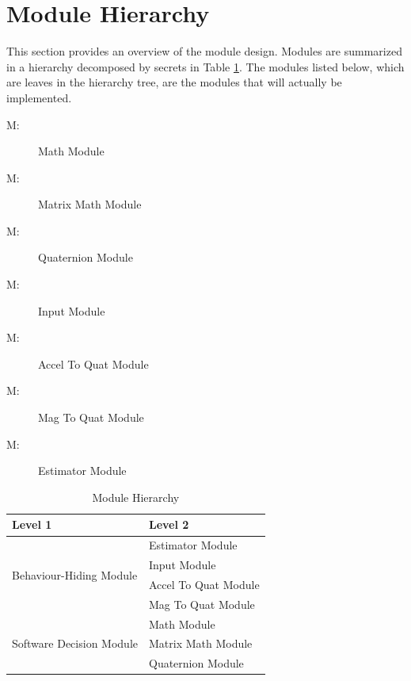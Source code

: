 \documentclass[12pt, titlepage]{article}
\newcounter{mnum}
\newcommand{\mthemnum}{M\themnum}
\begin{document}
\section{Module Hierarchy} \label{SecMH}

This section provides an overview of the module design. Modules are summarized in a hierarchy
decomposed by secrets in Table \ref{TblMH}. The modules listed below, which are leaves in the
hierarchy tree, are the modules that will actually be implemented.

\begin{description}
\item [ \mthemnum \label{m:mm}:] Math Module
\item [ \mthemnum \label{m:mmm}:] Matrix Math Module
\item [ \mthemnum \label{m:qm}:] Quaternion Module
\item [ \mthemnum \label{m:im}:] Input Module
\item [ \mthemnum \label{m:iqwomm}:] Accel To Quat
Module
\item [ \mthemnum \label{m:iqwmm}:] Mag To Quat Module
\item [ \mthemnum \label{m:em}:] Estimator Module
\end{description}


\begin{table}[h!]
\centering
\begin{tabular}{p{} p{}}
\toprule
\textbf{Level 1} & \textbf{Level 2}\\
\midrule


\multirow{4}{0.3\textwidth}{Behaviour-Hiding Module} & Estimator Module \\
  & Input Module \\
  & Accel To Quat Module \\
  & Mag To Quat Module \\
\midrule
\multirow{3}{0.3\textwidth}{Software Decision Module} & Math Module\\
  & Matrix Math Module \\
  & Quaternion Module \\
\bottomrule

\end{tabular}
\caption{Module Hierarchy}
\label{TblMH}
\end{table}
\end{document}
